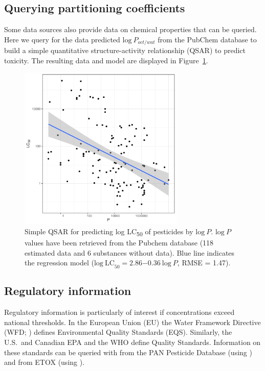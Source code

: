 \documentclass[article]{jss}
\begin{document}
\subsection[Querying partitioning coefficients]{Querying partitioning coefficients}
Some data sources also provide data on chemical properties that can be
queried.  Here we query for the  data predicted
$\mathrm{log}~P_{oct/wat}$ from the PubChem database to build a
simple quantitative structure-activity relationship (QSAR) to predict
toxicity. The resulting data and model are displayed in Figure~\ref{fig:fig3}.
%
\begin{CodeChunk}
\end{CodeChunk}
%

\begin{figure}[t!]
  \centering
  \includegraphics[width=0.7\textwidth]{plot_qsar-1} 
  \caption{Simple QSAR for predicting log LC\textsubscript{50} of
    pesticides by $\mathrm{log}~P$.  $\mathrm{log}~P$ values have been
    retrieved from the Pubchem database (118 estimated data and 6 substances without data).  Blue line
    indicates the regression model
    ($\mathrm{log~LC}_{50} = 2.86\ensuremath{-0.36}~\mathrm{log}~P$,
    RMSE = 1.47).}
\label{fig:fig3}
\end{figure}


\subsection[Regulatory information]{Regulatory information}
Regulatory information is particularly of interest if concentrations
exceed national thresholds.  In the European Union (EU) the Water
Framework Directive (WFD; \citealt{wfd2000directive}) defines
Environmental Quality Standards (EQS).  Similarly, the U.S.\ and
Canadian EPA and the WHO define Quality Standards.  Information on
these standards can be queried with  from the PAN
Pesticide Database (using ) and from ETOX (using
).
\end{document}
